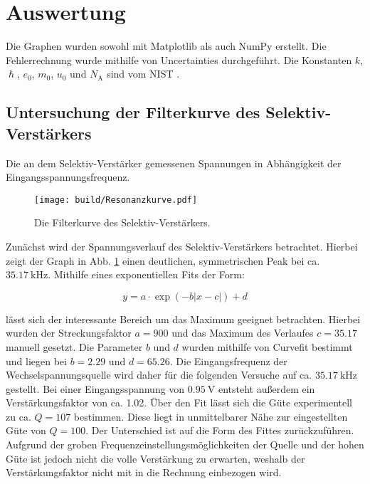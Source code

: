 \section{Auswertung}
\label{sec:Auswertung}

Die Graphen wurden sowohl mit Matplotlib \cite{matplotlib} als auch NumPy \cite{numpy} erstellt. Die
 Fehlerrechnung wurde mithilfe von Uncertainties \cite{uncertainties} durchgeführt.
Die Konstanten $k$, $\hslash$, $e_0$, $m_0$, $u_0$ und $N_\text{A}$ sind vom NIST \cite{nistgov}.
\subsection{Untersuchung der Filterkurve des Selektiv-Verstärkers}

\begin{table}
 \centering
 \caption{Die an dem Selektiv-Verstärker gemessenen Spannungen in Abhängigkeit der Eingangsspannungsfrequenz.}
 
 
\end{table}


\begin{figure}
 \centering
 \caption{Die Filterkurve des Selektiv-Verstärkers.}
 \texttt{[image: build/Resonanzkurve.pdf]}
 \label{fig:GraphSelektiv}
\end{figure}

Zunächst wird der Spannungsverlauf des Selektiv-Verstärkers betrachtet. Hierbei
zeigt der Graph in Abb. \ref{fig:GraphSelektiv} einen deutlichen, symmetrischen
Peak bei ca. $\SI{35.17}{\kilo\hertz}$. Mithilfe eines exponentiellen Fits der Form:

\begin{equation}
  y = a \cdot \exp(-b|x-c|)+d
  \end{equation}

lässt sich der interessante Bereich um das Maximum geeignet betrachten. Hierbei
wurden der Streckungsfaktor $a = 900$ und das Maximum des Verlaufes $c = 35.17$ manuell gesetzt. Die Parameter $b$
und $d$ wurden mithilfe von Curvefit bestimmt und liegen bei $b = 2.29$ und $d = 65.26$.
Die Eingangsfrequenz der
Wechselspannungsquelle wird daher für die folgenden Versuche auf ca. $\SI{35.17}{\kilo\hertz}$
gestellt. Bei einer Eingangsspannung von $\SI{0.95}{\volt}$ entsteht außerdem ein
Verstärkungsfaktor von ca. 1.02.
Über den Fit lässt sich die Güte experimentell zu ca. $Q = 107$ bestimmen. Diese
liegt in unmittelbarer Nähe zur eingestellten Güte von $Q = 100$. Der Unterschied
ist auf die Form des Fittes zurückzuführen. Aufgrund der groben Frequenzeinstellungsmöglichkeiten der Quelle und der hohen Güte
ist jedoch nicht die volle Verstärkung zu erwarten,
 weshalb der Verstärkungsfaktor nicht mit in die Rechnung einbezogen wird.

